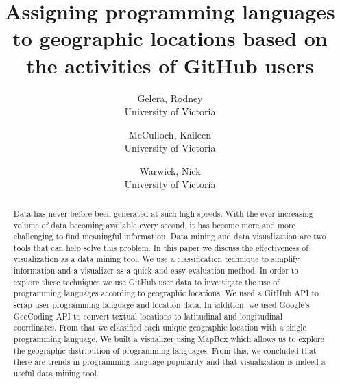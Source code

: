 \documentclass[11pt]{article}
\begin{document}
\title{Assigning programming languages to geographic locations based on the activities of GitHub users}

\author{
   Gelera, Rodney \\University of Victoria
   \and
   McCulloch, Kaileen \\University of Victoria
   \and
   Warwick, Nick \\University of Victoria
}

\maketitle

\begin{abstract}
Data has never before been generated at such high speeds. With the ever increasing volume of data becoming available every second, it has become more and more challenging to find meaningful information. Data mining and data visualization are two tools that can help solve this problem. In this paper we discuss the effectiveness of visualization as a data mining tool. We use a classification technique to simplify information and a visualizer as a quick and easy evaluation method. In order to explore these techniques we use GitHub user data to investigate the use of programming languages according to geographic locations. We used a GitHub API to scrap user programming language and location data. In addition, we used Google’s GeoCoding API to convert textual locations to latitudinal and longitudinal coordinates. From that we classified each unique geographic location with a single programming language. We built a visualizer using MapBox which allows us to explore the geographic distribution of programming languages. From this, we concluded that there are trends in programming language popularity and that visualization is indeed a useful data mining tool.
\end{abstract}

\newpage
\tableofcontents
\listoffigures
\newpage
\end{document}
